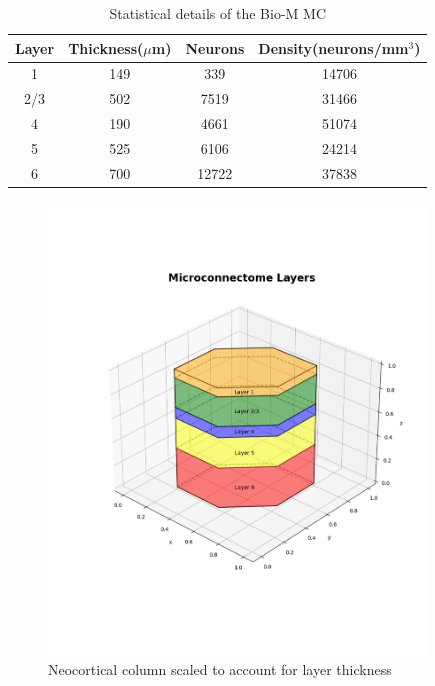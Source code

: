 \begin{center}
\begin{table}[H]
    \centering
    \captionsetup{justification=centering}
     \begin{tabular}{||c | c | c | c||} 
 \hline
 Layer & Thickness(\(\mu\)m) & Neurons & Density(neurons/mm\(^3\)) \\ [0.5ex] 
 \hline\hline
 1 & 149 & 339 & 14706 \\ 
 \hline
 2/3 & 502 & 7519 & 31466 \\
 \hline
 4 & 190 & 4661 & 51074 \\
 \hline
 5 & 525 & 6106 & 24214 \\
 \hline
 6 & 700 & 12722 & 37838 \\ 
 \hline
 \hline
\end{tabular}
    \caption{Statistical details of the Bio-M MC}
    \label{tab:my_label}
\end{table}

\end{center}
\begin{figure}[H]
\begin{center}
\captionsetup{justification=centering}
\includegraphics[width=10cm]{BioM/connectome.png}
\caption[center]{Neocortical column scaled to account for layer thickness}
\end{center}
\end{figure}



